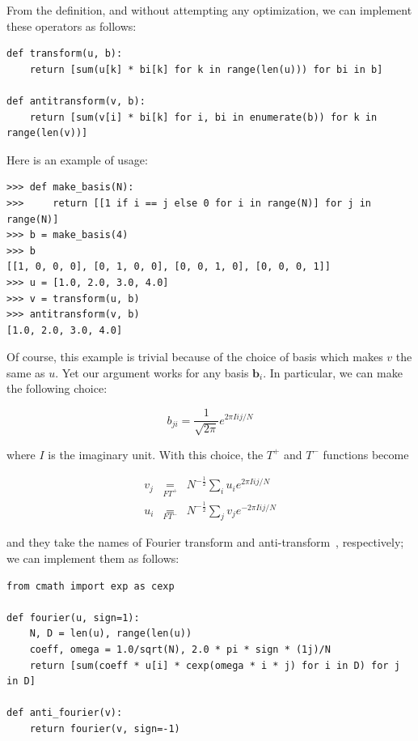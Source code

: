 \documentclass[justified, sixbynine]{tufte-book}
\def\stackunder#1#2{\mathrel{\mathop{#2}\limits_{#1}}}
\theoremstyle{plain}%
\newtheorem * {corollary}{Corollary}
\theoremstyle{definition}
\theoremstyle{remark}
\newtheorem * {remark}{Remark}
\newtheorem * {note}{Note}
\begin{document}
\begin{fullwidth}
From the definition, and without attempting any optimization, we can implement these operators as follows:

\begin{lstlisting}
def transform(u, b):
    return [sum(u[k] * bi[k] for k in range(len(u))) for bi in b]

def antitransform(v, b):
    return [sum(v[i] * bi[k] for i, bi in enumerate(b)) for k in range(len(v))]
\end{lstlisting}

Here is an example of usage:

\begin{lstlisting}
>>> def make_basis(N):
>>>     return [[1 if i == j else 0 for i in range(N)] for j in range(N)]
>>> b = make_basis(4)
>>> b
[[1, 0, 0, 0], [0, 1, 0, 0], [0, 0, 1, 0], [0, 0, 0, 1]]
>>> u = [1.0, 2.0, 3.0, 4.0]
>>> v = transform(u, b)
>>> antitransform(v, b)
[1.0, 2.0, 3.0, 4.0]
\end{lstlisting}

Of course, this example is trivial because of the choice of basis which makes $v$ the same as $u$. Yet our argument works for any basis $\mathbf{b}_i$. In particular, we can make the following choice:


\begin{equation}
b_{ji} = \frac{1}{\sqrt{2\pi}} e^{2\pi I ij/N}
\end{equation}

where $I$ is the imaginary unit. With this choice, the $T^+$ and $T^-$ functions become

\begin{eqnarray}
v_j &\stackunder{FT^+}{=}& N^{-\frac12} \sum_i u_i e^{2\pi I ij/N} \\
\label{fourierd1}
u_i &\stackunder{FT^-}{=}& N^{-\frac12} \sum_j v_j e^{-2\pi I ij/N}
\label{fourierd2}
\end{eqnarray}

and they take the names of Fourier transform and anti-transform~\cite{fourier}, respectively;
we can implement them as follows:

\begin{lstlisting}
from cmath import exp as cexp

def fourier(u, sign=1):
    N, D = len(u), range(len(u))
    coeff, omega = 1.0/sqrt(N), 2.0 * pi * sign * (1j)/N
    return [sum(coeff * u[i] * cexp(omega * i * j) for i in D) for j in D]

def anti_fourier(v):
    return fourier(v, sign=-1)
\end{lstlisting}


\end{fullwidth}
\end{document}
